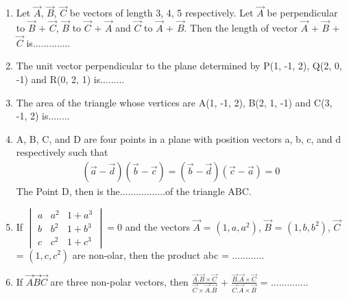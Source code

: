 \renewcommand{\theequation}{\theenumi}
\begin{enumerate}[label=\arabic*.,ref=\thesubsection.\theenumi]

\item Let $\overrightarrow{A}$, $\overrightarrow{B}$, $\overrightarrow{C}$ be vectors of length 3, 4, 5 respectively. Let $\overrightarrow{A}$ be perpendicular to $\overrightarrow{B}$ + $\overrightarrow{C}$, $\overrightarrow{B}$ to 
$\overrightarrow{C}$ + $\overrightarrow{A}$ and $\overrightarrow{C}$ to $\overrightarrow{A}$ + $\overrightarrow{B}$. Then the length of vector $\overrightarrow{A}$ + $\overrightarrow{B}$ + $\overrightarrow{C}$ is..............

\item The unit vector perpendicular to the plane determined by P(1, -1, 2), Q(2, 0, -1) and R(0, 2, 1) is.........

\item The area of the triangle whose vertices are  A(1, -1, 2), B(2, 1, -1) and C(3, -1, 2) is........

\item A, B, C, and D are four points in a plane with position vectors a, b, c, and d respectively such that
\begin{align*}
(\overrightarrow{a} - \overrightarrow{d}) (\overrightarrow{b} - \overrightarrow{c}) 
= (\overrightarrow{b} - \overrightarrow{d}) (\overrightarrow{c} - \overrightarrow{a}) = 0
\end{align*}
The Point D, then is the.................of the triangle ABC.

\item If 
$\begin{vmatrix}
a & a^{2} & 1 + a^{3} \\ b & b^{2} & 1 + b^{3} \\ c & c^{2} & 1 + c^{3} 
\end{vmatrix} = 0$ 
and the vectors $\overrightarrow{A}$ = $(1, a, a^{2})$, $\overrightarrow{B}$ = $(1, b, b^{2})$, $\overrightarrow{C}$ = $(1, c, c^{2})$ are non-olar, then the product abc = ............

\item If $\overrightarrow{A} \overrightarrow{B} \overrightarrow{C}$ are three non-polar vectors, then 
$\frac{\overrightarrow{A} . \overrightarrow{B} \times \overrightarrow{C}}{\overrightarrow{C} \times \overrightarrow{A} . \overrightarrow{B}}$ + $\frac{\overrightarrow{B} . \overrightarrow{A} \times \overrightarrow{C}}{\overrightarrow{C} . \overrightarrow{A} \times \overrightarrow{B}}$ = ..............


\end{enumerate}
